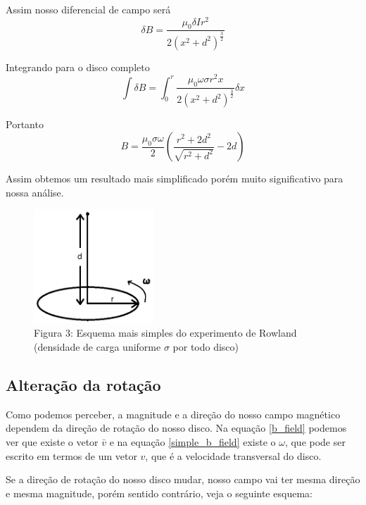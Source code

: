 \documentclass[12pt, letterpaper]{article}
\begin{document}
    Assim nosso diferencial de campo será
    \begin{equation}
        \delta B = \frac{\mu_0\delta I r^2}{2(x^2+d^2)^\frac{3}{2}}
    \end{equation}

    Integrando para o disco completo
    \begin{equation}
        \int \delta B = \int_{0}^{r} \frac{\mu_0\omega\sigma r^2 x}{2(x^2 + d^2)^\frac{3}{2}}\delta x
    \end{equation}

    Portanto
    \begin{equation} \label{simple_b_field}
        B = \frac{\mu_0\sigma\omega}{2}\left(\frac{r^2 + 2d^2}{\sqrt{r^2 + d^2}} - 2d \right)
    \end{equation}

    Assim obtemos um resultado mais simplificado porém muito significativo para nossa análise.
    \begin{figure}[h]
        \centering
        \includegraphics[width=0.4\textwidth]{simple}
        \\{Figura 3: Esquema mais simples do experimento de Rowland (densidade de carga uniforme $\sigma$ por todo disco)}
        \label{fig:simple}
    \end{figure}

    \subsection{Alteração da rotação}
    Como podemos perceber, a magnitude e a direção do nosso campo magnético dependem da direção de rotação do nosso disco. Na equação \ref{b_field} podemos ver que existe o vetor $\bar{v}$ e na equação \ref{simple_b_field} existe o $\omega$, que pode ser escrito em termos de um vetor $v$, que é a velocidade transversal do disco.

    Se a direção de rotação do nosso disco mudar, nosso campo vai ter mesma direção e mesma magnitude, porém sentido contrário, veja o seguinte esquema:
\end{document}
